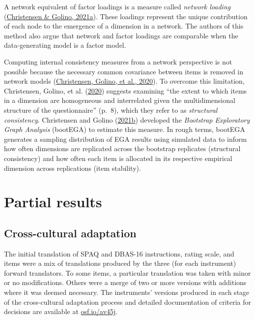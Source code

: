 \documentclass[
  ,doc,11pt, twoside,floatsintext]{apa6}
\begin{document}
A network equivalent of factor loadings is a measure called \emph{network loading} (\protect\hyperlink{ref-christensen2021}{Christensen \& Golino, 2021a}). These loadings represent the unique contribution of each node to the emergence of a dimension in a network. The authors of this method also argue that network and factor loadings are comparable when the data-generating model is a factor model.

Computing internal consistency measures from a network perspective is not possible because the necessary common covariance between items is removed in network models (\protect\hyperlink{ref-christensen2020b}{Christensen, Golino, et al., 2020}). To overcome this limitation, Christensen, Golino, et al. (\protect\hyperlink{ref-christensen2020b}{2020}) suggests examining ``the extent to which items in a dimension are homogeneous and interrelated given the multidimensional structure of the questionnaire'' (p.~8), which they refer to as \emph{structural consistency}. Christensen and Golino (\protect\hyperlink{ref-christensen2021a}{2021b}) developed the \emph{Bootstrap Exploratory Graph Analysis} (bootEGA) to estimate this measure. In rough terms, bootEGA generates a sampling distribution of EGA results using simulated data to inform how often dimensions are replicated across the bootstrap replicates (structural consistency) and how often each item is allocated in its respective empirical dimension across replications (item stability).

\newpage

\hypertarget{partial-results}{%
\section{Partial results}\label{partial-results}}

\hypertarget{cross-cultural-adaptation}{%
\subsection{Cross-cultural adaptation}\label{cross-cultural-adaptation}}

The initial translation of SPAQ and DBAS-16 instructions, rating scale, and items were a mix of translations produced by the three (for each instrument) forward translators. To some items, a particular translation was taken with minor or no modifications. Others were a merge of two or more versions with additions where it was deemed necessary. The instruments' versions produced in each stage of the cross-cultural adaptation process and detailed documentation of criteria for decisions are available at \href{https://osf.io/av45j/}{osf.io/av45j}.
\end{document}
